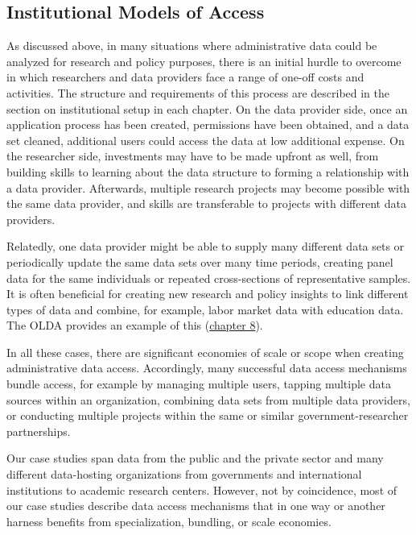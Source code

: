 \hypertarget{institutional-models-of-access}{%
\subsection{Institutional Models of Access}\label{institutional-models-of-access}}

As discussed above, in many situations where administrative data could be analyzed for research and policy purposes, there is an initial hurdle to overcome in which researchers and data providers face a range of one-off costs and activities. The structure and requirements of this process are described in the section on institutional setup in each chapter. On the data provider side, once an application process has been created, permissions have been obtained, and a data set cleaned, additional users could access the data at low additional expense. On the researcher side, investments may have to be made upfront as well, from building skills to learning about the data structure to forming a relationship with a data provider. Afterwards, multiple research projects may become possible with the same data provider, and skills are transferable to projects with different data providers.

Relatedly, one data provider might be able to supply many different data sets or periodically update the same data sets over many time periods, creating panel data for the same individuals or repeated cross-sections of representative samples. It is often beneficial for creating new research and policy insights to link different types of data and combine, for example, labor market data with education data. The OLDA provides an example of this (\protect\hyperlink{olda}{chapter 8}).

In all these cases, there are significant economies of scale or scope when creating administrative data access. Accordingly, many successful data access mechanisms bundle access, for example by managing multiple users, tapping multiple data sources within an organization, combining data sets from multiple data providers, or conducting multiple projects within the same or similar government-researcher partnerships.

Our case studies span data from the public and the private sector and many different data-hosting organizations from governments and international institutions to academic research centers. However, not by coincidence, most of our case studies describe data access mechanisms that in one way or another harness benefits from specialization, bundling, or scale economies.

